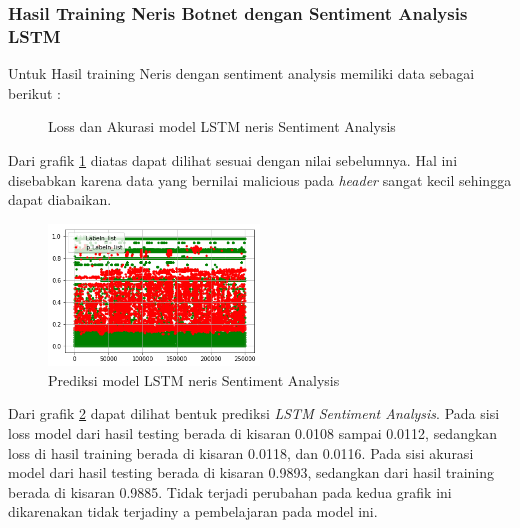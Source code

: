 \documentclass[./skripsi.tex]{subfiles}
\begin{document}
\subsubsection{Hasil Training Neris Botnet dengan Sentiment Analysis LSTM}
\par Untuk Hasil training Neris dengan sentiment analysis memiliki data sebagai berikut :

\begin{figure}[H]
    \centering
    \caption{Loss dan Akurasi model LSTM neris Sentiment Analysis}
    \label{fig:lstms_neris}
\end{figure}

\par Dari grafik \ref{fig:lstms_neris} diatas dapat dilihat sesuai dengan nilai sebelumnya. Hal ini disebabkan karena data yang bernilai malicious pada \textit{header} sangat kecil sehingga dapat diabaikan.

\begin{figure}[H]
    \centering
    \includegraphics[width=0.5\textwidth]{public/assets/img/lstms_neris_pred.png}
    \caption{Prediksi model LSTM neris Sentiment Analysis}
    \label{fig:lstms_neris_pred}
\end{figure}

\par Dari grafik \ref{fig:lstms_neris_pred}  dapat dilihat bentuk prediksi \textit{LSTM Sentiment Analysis}. Pada sisi loss model dari hasil testing berada di kisaran 0.0108 sampai 0.0112, sedangkan loss di hasil training berada di kisaran 0.0118, dan 0.0116. Pada sisi akurasi model dari hasil testing berada di kisaran 0.9893, sedangkan dari hasil training berada di kisaran 0.9885. Tidak terjadi perubahan pada kedua grafik ini dikarenakan tidak terjadiny a pembelajaran pada model ini.
\end{document}

